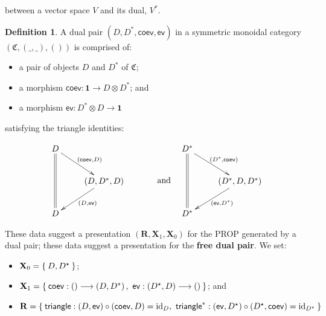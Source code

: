 \documentclass[pra,floatfix,
amsmath,superscriptaddress, 12pt]{article}
\theoremstyle{definition}
\newtheorem{defn}[thm]{Definition}
\newcommand{\evmap}{\mathsf{ev}}
\newcommand{\coev}{\mathsf{coev}}
\DeclareMathOperator{\id}{{\normalfont\text{id}}}
\begin{document}
between a vector space $V$ and its dual, $V^*$.

\begin{defn}
A dual pair $\left(D,D^{*},\coev,\evmap\right)$ in a symmetric monoidal
category $\left(\mathfrak{C},\left(\_,\_\right),\left(\right)\right)$
is comprised of:
\begin{itemize}
\item a pair of objects $D$ and $D^{*}$ of $\mathfrak{C}$;
\item a morphism $\coev:\mathbf{1}\longrightarrow D\otimes D^{*}$; and
\item a morphism $\evmap:D^{*}\otimes D\longrightarrow\mathbf{1}$
\end{itemize}
satisfying the triangle identities:

\begin{align*}
    \vcenter{\vbox{\xymatrix{
        D\ar@{=}[dd]
        \ar[dr]^{\left(\coev,D\right)}
            \\
            &
            \left(D,D^{*},D\right)
            \ar[dl]^{\left(D,\evmap\right)}
                \\
        D
    }}}
        &
        \mathrm{ \ \ \ \ \ \ \ \ \ \  \ and }
            &
            \vcenter{\vbox{\xymatrix{
                D^{*}
                \ar@{=}[dd]
                \ar[dr]^{\left(D^{*},\coev\right)}
                    \\
                    &
                    \left(D^{*},D,D^{*}\right)
                    \ar[dl]^{\left(\evmap,D^{*}\right)}
                        \\
                D^{*}
    }}}
    \end{align*}
\end{defn}

These data suggest a presentation $(\mathbf{R},\mathbf{X}_1,\mathbf{X}_0)$ for the \textsf{PROP}
generated by a dual pair; these data suggest a presentation for the \textbf{free dual pair}. We set:

\begin{itemize}
    \item $\mathbf{X}_0 = \Set{D,D^\star}$;
    \item $\mathbf{X}_1 = \Set{
        \coev:\left(\right) \longrightarrow \left(D,D^{*}\right), \
        \evmap:\left(D^{\star},D\right)\longrightarrow \left(\right)
    }$; and
    \item $\mathbf{R} =
    \Set{
        \mathsf{triangle}:(D,\evmap) \circ (\coev,D) = \id_{D}, \ 
        \mathsf{triangle}^{*}:(\evmap,D^\star)\circ(D^\star,\coev) = \id_{D^\star}
    }$
\end{itemize}
\end{document}
